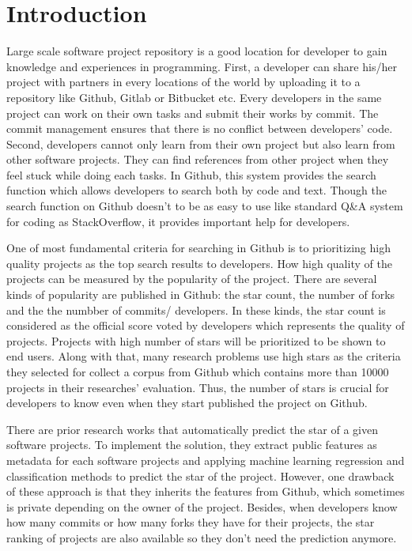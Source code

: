 \section{Introduction}
Large scale software project repository is a good location for developer to gain knowledge and experiences in programming. First, a developer can share his/her project with partners in every locations of the world by uploading it to a repository like Github, Gitlab or Bitbucket etc. Every developers in the same project can work on their own tasks and submit their works by commit. The commit management ensures that there is no conflict between developers' code. Second, developers cannot only learn from their own project but also learn from other software projects. They can find references from other project when they feel stuck while doing each tasks. In Github, this system provides the search function which allows developers to search both by code and text. Though the search function on Github doesn't to be as easy to use like standard Q\&A system for coding as StackOverflow, it provides important help for developers.

One of most fundamental criteria for searching in Github is to prioritizing high quality projects as the top search results to developers. How high quality of the projects can be measured by the popularity of the project. There are several kinds of popularity are published in Github: the star count, the number of forks and the the numbber of commits/ developers. In these kinds, the star count is considered as the official score voted by developers which represents the quality of projects. Projects with high number of stars will be prioritized to be shown to end users. Along with that, many research problems use high stars as the criteria they selected for collect a corpus from Github which contains more than 10000 projects in their researches' evaluation. Thus, the number of stars is crucial for developers to know even when they start published the project on Github.

There are prior research works that automatically predict the star of a given software projects. To implement the solution, they extract public features as metadata for each software projects and applying machine learning regression and classification methods to predict the star of the project.  However, one drawback of these approach is that they inherits the features from Github, which sometimes is private depending on the owner of the project. Besides, when developers know how many commits or how many forks they have for their projects, the star ranking of projects are also available so they don't need the prediction anymore.

